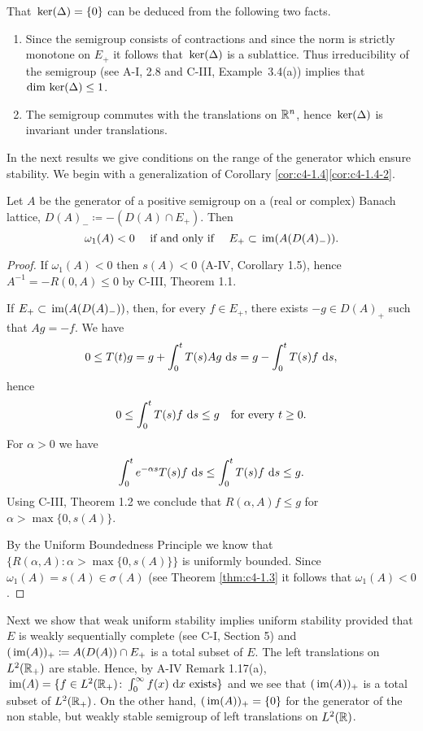 That $\mathop{}\mathrm{ker}(\Delta) = \{0\}$ can be deduced from the following two facts.
\begin{enumerate}[\upshape (i), wide, labelindent=.5em]
\item 
Since the semigroup consists of contractions and since the norm is strictly monotone on $E_{+}$ it follows that $\mathop{}\mathrm{ker}(\Delta)$ is a sublattice.
Thus irreducibility of the semigroup (see A-I, 2.8 and C-III, Example~3.4(a)) implies that $\dim \mathop{}\mathrm{ker}(\Delta) \leq 1$.

\item 
The semigroup commutes with the translations on $\mathbb{R}^{n}$, hence $\mathop{}\mathrm{ker}(\Delta)$ is invariant under translations.

\end{enumerate}
In the next results we give conditions on the range of the generator which ensure stability.
We begin with a generalization of Corollary \ref{cor:c4-1.4}\ref{cor:c4-1.4-2}.
\begin{proposition}\label{prop:c4-1.6}
%
%
%
Let $A$ be the generator of a positive semigroup on a (real or complex) Banach lattice, $D(A)_{-} \coloneqq -(D(A) \cap E_{+})$.
Then 
\[ 
\text{$\omega_{1}(A) < 0 $ \quad if and only if \quad $E_{+} \subset \mathop{}\mathrm{im}(A(D(A)_{-}))$.}
\]
\end{proposition}
\begin{proof}
If $\omega_{1}(A) < 0$ then $s(A) < 0$ (A-IV, Corollary 1.5), hence $A^{-1} = -R(0,A) \leq 0$ by C-III, Theorem 1.1.

If $E_{+} \subset \mathop{}\mathrm{im}(A(D(A)_{-}))$, then, for every $f \in E_{+}$, there exists $-g \in D(A)_{+}$ such that $Ag = -f$.
We have 
\[
0 \leq T(t)g = g + \int_{0}^{t} T(s)Ag \, \mathop{}\!\mathrm{d}{s} = g - \int_{0}^{t} T(s)f \, \mathop{}\!\mathrm{d}{s},
\]
hence 
\[
0 \leq \int_{0}^{t} T(s)f \, \mathop{}\!\mathrm{d}{s} \leq g 
\quad \text{for every $t \geq 0$.}
\]
For $\alpha > 0$ we have 
\[
\int_{0}^{t} e^{-\alpha s}T(s)f \, \mathop{}\!\mathrm{d}{s} \leq \int_{0}^{t} T(s)f \, \mathop{}\!\mathrm{d}{s} \leq g .
\]
Using C-III, Theorem 1.2 we conclude that $R(\alpha,A)f \leq g$ for $\alpha > \max\{0,s(A)\}$.

By the Uniform Boundedness Principle we know that $\{R(\alpha,A) \colon \alpha > \max\{0,s(A)\}\}$ is uniformly bounded.
Since $\omega_{1}(A) = s(A) \in \sigma(A)$ (see Theorem \ref{thm:c4-1.3} it follows that $\omega_{1}(A) < 0$.
\end{proof}
Next we show that weak uniform stability implies uniform stability provided that $E$ is weakly sequentially complete (see C-I, Section 5) and $(\mathop{}\mathrm{im}(A))_{+} \coloneqq A(D(A)) \cap E_{+}$ is a total subset of $E$.
The left translations on $L^{2}(\mathbb{R}_{+})$ are stable.
Hence, by A-IV Remark 1.17(a), $\mathop{}\mathrm{im}(A) = \{f \in L^{2}(\mathbb{R}_{+}) \colon \int_{0}^{\infty} f(x) \, \mathop{}\!\mathrm{d}{x} \text{ exists}\}$ and we see that $(\mathop{}\mathrm{im}(A))_{+}$ is a total subset of $L^{2}(\mathbb{R}_{+})$.
On the other hand, $(\mathop{}\mathrm{im}(A))_{+} = \{0\}$ for the generator of the non stable, but weakly stable semigroup of left translations on $L^{2}(\mathbb{R})$.


